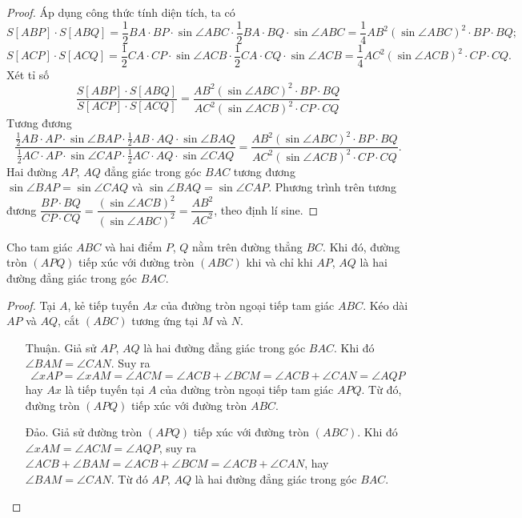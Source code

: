         \begin{proof}
            Áp dụng công thức tính diện tích, ta có
            \[S[ABP] \cdot S[ABQ] = \frac{1}{2} BA \cdot BP \cdot \sin \angle ABC \cdot \frac{1}{2} BA \cdot BQ \cdot \sin \angle ABC = \frac{1}{4} AB^2 \left(\sin \angle ABC\right)^2 \cdot BP \cdot BQ \text{;}\]
            \[S[ACP] \cdot S[ACQ] = \frac{1}{2} CA \cdot CP \cdot \sin \angle ACB \cdot \frac{1}{2} CA \cdot CQ \cdot \sin \angle ACB = \frac{1}{4} AC^2 \left(\sin \angle ACB\right)^2 \cdot CP \cdot CQ \text{.}\]
            Xét tỉ số
            \[\frac{S[ABP] \cdot S[ABQ]}{S[ACP] \cdot S[ACQ]} = \frac{AB^2 \left(\sin \angle ABC\right)^2 \cdot BP \cdot BQ}{AC^2 \left(\sin \angle ACB\right)^2 \cdot CP \cdot CQ}\]
            Tương đương
            \[\frac{\frac{1}{2} AB \cdot AP \cdot \sin \angle BAP \cdot \frac{1}{2} AB \cdot AQ \cdot \sin \angle BAQ}{\frac{1}{2} AC \cdot AP \cdot \sin \angle CAP \cdot \frac{1}{2} AC \cdot AQ \cdot \sin \angle CAQ} = \frac{AB^2 \left(\sin \angle ABC\right)^2 \cdot BP \cdot BQ}{AC^2 \left(\sin \angle ACB\right)^2 \cdot CP \cdot CQ}.\]
            Hai đường \(AP\), \(AQ\) đẳng giác trong góc \(BAC\) tương đương \(\sin \angle BAP = \sin \angle CAQ\) và \(\sin \angle BAQ = \sin \angle CAP\). Phương trình trên tương đương
            \(\dfrac{BP \cdot BQ}{CP \cdot CQ} = \dfrac{\left(\sin \angle ACB\right)^2}{\left(\sin \angle ABC\right)^2} = \dfrac{AB^2}{AC^2}\), theo định lí sine.
        \end{proof}

        \begin{property}
            Cho tam giác \(ABC\) và hai điểm \(P\), \(Q\) nằm trên đường thẳng \(BC\). Khi đó, đường tròn \((APQ)\) tiếp xúc với đường tròn \((ABC)\) khi và chỉ khi \(AP\), \(AQ\) là hai đường đẳng giác trong góc \(BAC\).
        \end{property}

        \begin{proof}
            Tại \(A\), kẻ tiếp tuyến \(Ax\) của đường tròn ngoại tiếp tam giác \(ABC\). Kéo dài \(AP\) và \(AQ\), cắt \((ABC)\) tương ứng tại \(M\) và \(N\).

            \begin{enumerate}[leftmargin=1.25cm]
                \item[Thuận.] Giả sử \(AP\), \(AQ\) là hai đường đẳng giác trong góc \(BAC\). Khi đó \(\angle BAM = \angle CAN\). Suy ra
                \[\angle xAP = \angle xAM = \angle ACM = \angle ACB + \angle BCM = \angle ACB + \angle CAN = \angle AQP\]
                hay \(Ax\) là tiếp tuyến tại \(A\) của đường tròn ngoại tiếp tam giác \(APQ\). Từ đó, đường tròn \((APQ)\) tiếp xúc với đường tròn \(ABC\).
                \item[Đảo.] Giả sử đường tròn \((APQ)\) tiếp xúc với đường tròn \((ABC)\). Khi đó \(\angle xAM = \angle ACM = \angle AQP\), suy ra \(\angle ACB + \angle BAM = \angle ACB + \angle BCM = \angle ACB + \angle CAN\), hay \(\angle BAM = \angle CAN\). Từ đó \(AP\), \(AQ\) là hai đường đẳng giác trong góc \(BAC\).
            \end{enumerate}
        \end{proof}

